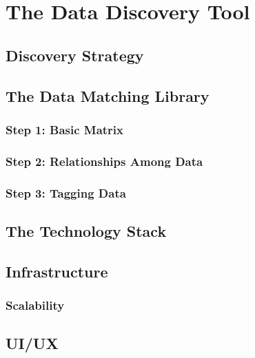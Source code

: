 \chapter{The Data Discovery Tool}\label{ch:ch2label}

\section{Discovery Strategy}

\section{The Data Matching Library}


\subsection{Step 1: Basic Matrix}

\subsection{Step 2: Relationships Among Data}

\subsection{Step 3: Tagging Data}

\section{The Technology Stack}

\section{Infrastructure}

\subsection{Scalability}

\section{UI/UX}
